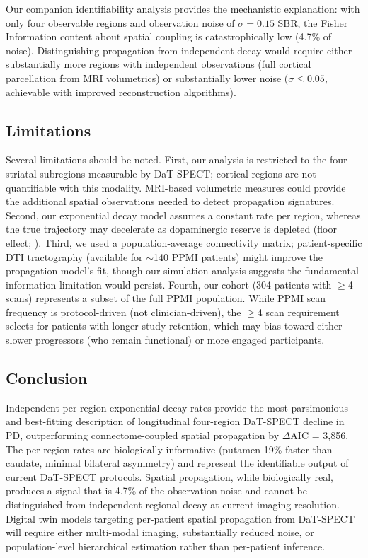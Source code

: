 Our companion identifiability analysis \cite{dupre2026paper8a} provides the mechanistic explanation: with only four observable regions and observation noise of $\sigma = 0.15$ SBR, the Fisher Information content about spatial coupling is catastrophically low (4.7\% of noise). Distinguishing propagation from independent decay would require either substantially more regions with independent observations (full cortical parcellation from MRI volumetrics) or substantially lower noise ($\sigma \leq 0.05$, achievable with improved reconstruction algorithms).

\subsection{Limitations}

Several limitations should be noted. First, our analysis is restricted to the four striatal subregions measurable by DaT-SPECT; cortical regions are not quantifiable with this modality. MRI-based volumetric measures could provide the additional spatial observations needed to detect propagation signatures. Second, our exponential decay model assumes a constant rate per region, whereas the true trajectory may decelerate as dopaminergic reserve is depleted (floor effect; \cite{sung2016}). Third, we used a population-average connectivity matrix; patient-specific DTI tractography (available for $\sim$140 PPMI patients) might improve the propagation model's fit, though our simulation analysis suggests the fundamental information limitation would persist. Fourth, our cohort (304 patients with $\geq$4 scans) represents a subset of the full PPMI population. While PPMI scan frequency is protocol-driven (not clinician-driven), the $\geq$4 scan requirement selects for patients with longer study retention, which may bias toward either slower progressors (who remain functional) or more engaged participants.

\subsection{Conclusion}

Independent per-region exponential decay rates provide the most parsimonious and best-fitting description of longitudinal four-region DaT-SPECT decline in PD, outperforming connectome-coupled spatial propagation by $\Delta$AIC = 3,856. The per-region rates are biologically informative (putamen 19\% faster than caudate, minimal bilateral asymmetry) and represent the identifiable output of current DaT-SPECT protocols. Spatial propagation, while biologically real, produces a signal that is 4.7\% of the observation noise and cannot be distinguished from independent regional decay at current imaging resolution. Digital twin models targeting per-patient spatial propagation from DaT-SPECT will require either multi-modal imaging, substantially reduced noise, or population-level hierarchical estimation rather than per-patient inference.

